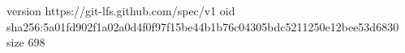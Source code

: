 version https://git-lfs.github.com/spec/v1
oid sha256:5a01fd902f1a02a0d4f0f97f15be44b1b76c04305bdc5211250e12bee53d6830
size 698

